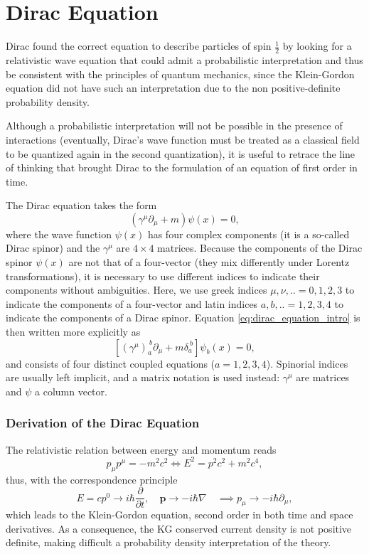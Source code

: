 \section{Dirac Equation}
Dirac found the correct equation to describe particles of spin \(\tfrac{1}{2}\) by looking for a relativistic wave equation that could admit a probabilistic interpretation and thus be consistent with the principles of quantum mechanics, since the Klein-Gordon equation did not have such an interpretation due to the non positive-definite probability density.

Although a probabilistic interpretation will not be possible in the presence of interactions (eventually, Dirac’s wave function must be treated as a classical field to be quantized again in the second quantization), it is useful to retrace the line of thinking that brought Dirac to the formulation of an equation of first order in time.

The Dirac equation takes the form
\begin{equation}
    (\gamma^{\mu} \partial_{\mu} + m) \psi(x) = 0,
    \label{eq:dirac_equation_intro}
\end{equation}
where the wave function \(\psi(x)\) has four complex components (it is a so-called Dirac spinor) and the \(\gamma^{\mu}\) are \(4\times 4\) matrices. Because the components of the Dirac spinor \(\psi(x)\) are not that of a four-vector (they mix differently under Lorentz transformations), it is necessary to use different indices to indicate their components without ambiguities. Here, we use greek indices \(\mu, \nu, .. = 0, 1, 2, 3\) to indicate the components of a four-vector and latin indices \(a, b, .. = 1, 2, 3, 4\) to indicate the components of a Dirac spinor. Equation \eqref{eq:dirac_equation_intro} is then written more explicitly as
\[
    \left[ \left(\gamma^{\mu}\right)_a^{\ b} \partial_{\mu} + m \delta_a^{\ b} \right] \psi_b(x) = 0,
\]
and consists of four distinct coupled equations (\(a=1, 2, 3, 4\)). Spinorial indices are usually left implicit, and a matrix notation is used instead: \(\gamma^\mu\) are matrices and \(\psi\) a column vector.

\subsubsection{Derivation of the Dirac Equation}

The relativistic relation between energy and momentum reads
\[
    p_\mu p^{\mu} = -m^2c^2 \iff E^2 = p^2 c^2 + m^2 c^4,
\]
thus, with the correspondence principle
\[
    E = cp^0 \to i \hbar \frac{\partial}{\partial t}, \quad \mathbf{p} \to -i \hbar \nabla \quad \implies p_\mu \to - i \hbar \partial_\mu,
\]
which leads to the Klein-Gordon equation, second order in both time and space derivatives. As a consequence, the KG conserved current density is not positive definite, making difficult a probability density interpretation of the theory.

